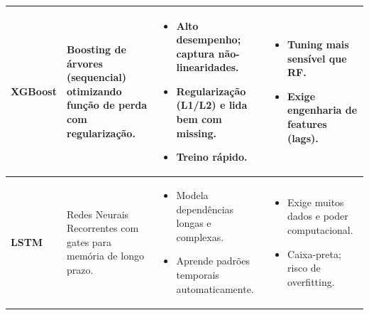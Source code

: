 \begin{table}[!ht]
\begin{tabular}{|p{}|p{}|p{}|p{}|}
    \textbf{XGBoost} & Boosting de árvores (sequencial) otimizando função de perda com regularização. & \begin{itemize}[leftmargin=*,noitemsep,topsep=0pt] \item Alto desempenho; captura não-linearidades. \item Regularização (L1/L2) e lida bem com missing. \item Treino rápido. \end{itemize} & \begin{itemize}[leftmargin=*,noitemsep,topsep=0pt] \item Tuning mais sensível que RF. \item Exige engenharia de features (lags). \end{itemize} \\ \hline
    \textbf{LSTM} & Redes Neurais Recorrentes com gates para memória de longo prazo. & \begin{itemize}[leftmargin=*,noitemsep,topsep=0pt] \item Modela dependências longas e complexas. \item Aprende padrões temporais automaticamente. \end{itemize} & \begin{itemize}[leftmargin=*,noitemsep,topsep=0pt] \item Exige muitos dados e poder computacional. \item Caixa-preta; risco de overfitting. \end{itemize} \\ \hline
    \end{tabular}
\end{table}
